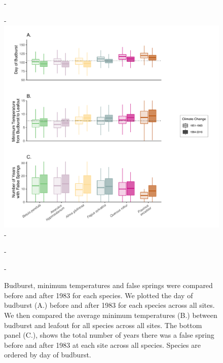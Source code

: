 \documentclass{article}\usepackage[]{graphicx}\usepackage[]{color}
\begin{document}
{\begin{figure} [H]
  -\begin{center}
  -\includegraphics[width=14cm]{..//analyses/figures/Boxplot_BBTminFS_noDots.pdf}
  -\caption{Budburst, minimum temperatures and false springs were compared before and after 1983 for each species. We plotted the day of budburst (A.) before and after 1983 for each species across all sites. We then compared the average minimum temperatures (B.) between budburst and leafout for all species across all sites. The bottom panel (C.), shows the total number of years there was a false spring before and after 1983 at each site across all species. Species are ordered by day of budburst.  }\label{fig:boxfs}
  -\end{center}
  -\end{figure}}
  
\end{document}
